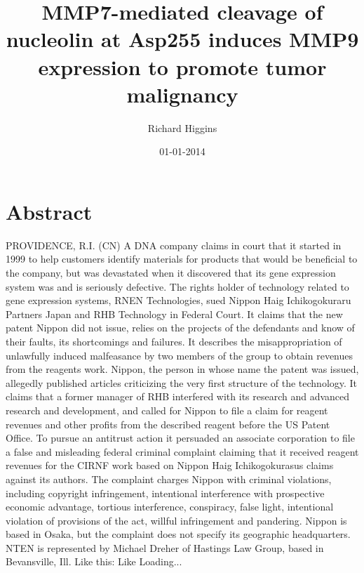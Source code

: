 \documentclass{article}%
\title{MMP7{-}mediated cleavage of nucleolin at Asp255 induces MMP9 expression to promote tumor malignancy}%
\author{Richard Higgins}%
\affil{INSERM, U895 (quipe 1), Equipe lablise Ligue Contre le Cancer, C3M, 06204 Nice, France}%
\date{01{-}01{-}2014}%
\begin{document}
%
\normalsize%
\maketitle%
\section{Abstract}%
\label{sec:Abstract}%
PROVIDENCE, R.I. (CN)  A DNA company claims in court that it started in 1999 to help customers identify materials for products that would be beneficial to the company, but was devastated when it discovered that its gene expression system was and is seriously defective.\newline%
The rights holder of technology related to gene expression systems, RNEN Technologies, sued Nippon Haig Ichikogokuraru Partners Japan and RHB Technology in Federal Court.\newline%
It claims that the new patent Nippon did not issue, relies on the projects of the defendants and know of their faults, its shortcomings and failures.\newline%
It describes the misappropriation of unlawfully induced malfeasance by two members of the group to obtain revenues from the reagents work.\newline%
Nippon, the person in whose name the patent was issued, allegedly published articles criticizing the very first structure of the technology.\newline%
It claims that a former manager of RHB interfered with its research and advanced research and development, and called for Nippon to file a claim for reagent revenues and other profits from the described reagent before the US Patent Office.\newline%
To pursue an antitrust action it persuaded an associate corporation to file a false and misleading federal criminal complaint claiming that it received reagent revenues for the CIRNF work based on Nippon Haig Ichikogokurasus claims against its authors.\newline%
The complaint charges Nippon with criminal violations, including copyright infringement, intentional interference with prospective economic advantage, tortious interference, conspiracy, false light, intentional violation of provisions of the act, willful infringement and pandering.\newline%
Nippon is based in Osaka, but the complaint does not specify its geographic headquarters.\newline%
NTEN is represented by Michael Dreher of Hastings Law Group, based in Bevansville, Ill.\newline%
Like this: Like Loading...
\end{document}

